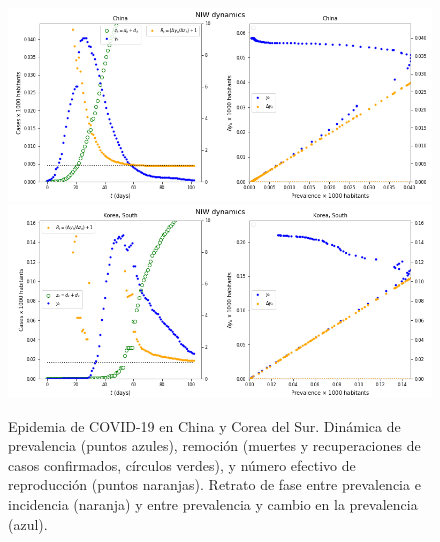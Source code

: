\documentclass[8pt]{article}
\begin{document}
\begin{figure}[h] 
\centering
\includegraphics[width=\textwidth]{figures/dam_COVID19_JHU_dynamicsDataSIRPP_China}
\\
\includegraphics[width=\textwidth]{figures/dam_COVID19_JHU_dynamicsDataSIRPP_SouthKorea}
\\
\caption{Epidemia de COVID-19 en China y Corea del Sur. 
Dinámica de prevalencia (puntos azules), remoción (muertes y recuperaciones de casos confirmados, círculos verdes), y número efectivo de reproducción (puntos naranjas).  Retrato de fase entre prevalencia e incidencia (naranja) y entre prevalencia y cambio en la prevalencia (azul).}\label{fig:dataPPNIW_SKChina}
\end{figure}
\end{document}
